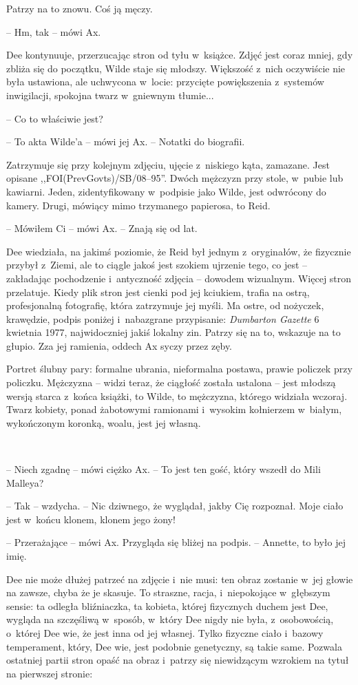 \documentclass[oneside,polish,11pt,sfheadings]{mwbk}
\begin{document}
Patrzy na to znowu. Coś ją męczy.

-- Hm, tak -- mówi Ax.

Dee kontynuuje, przerzucając stron od tyłu w~książce. Zdjęć jest coraz
mniej, gdy zbliża się do początku, Wilde staje się młodszy. Większość z~nich oczywiście nie była ustawiona, ale uchwycona w~locie: przycięte
powiększenia z~systemów inwigilacji, spokojna twarz w~gniewnym tłumie...

-- Co to właściwie jest?

-- To akta Wilde'a -- mówi jej Ax. -- Notatki do biografii.

Zatrzymuje się przy kolejnym zdjęciu, ujęcie z~niskiego kąta, zamazane.
Jest opisane ,,FOI(PrevGovts)/SB/08--95''. Dwóch mężczyzn przy stole, w~pubie lub kawiarni. Jeden, zidentyfikowany w~podpisie jako Wilde, jest
odwrócony do kamery. Drugi, mówiący mimo trzymanego papierosa, to Reid.

-- Mówiłem Ci -- mówi Ax. -- Znają się od lat.

Dee wiedziała, na jakimś poziomie, że Reid był jednym z~oryginałów, że
fizycznie przybył z~Ziemi, ale to ciągle jakoś jest szokiem ujrzenie
tego, co jest -- zakładając pochodzenie i~antyczność zdjęcia -- dowodem
wizualnym. Więcej stron przelatuje. Kiedy plik stron jest cienki pod jej
kciukiem, trafia na ostrą, profesjonalną fotografię, która zatrzymuje
jej myśli. Ma ostre, od nożyczek, krawędzie, podpis poniżej i~nabazgrane
przypisanie: \emph{Dumbarton Gazette} 6 kwietnia 1977, najwidoczniej
jakiś lokalny zin. Patrzy się na to, wskazuje na to głupio. Zza jej
ramienia, oddech Ax syczy przez zęby.

Portret ślubny pary: formalne ubrania, nieformalna postawa, prawie
policzek przy policzku. Mężczyzna -- widzi teraz, że ciągłość została
ustalona -- jest młodszą wersją starca z~końca książki, to Wilde, to
mężczyzna, którego widziała wczoraj. Twarz kobiety, ponad żabotowymi
ramionami i~wysokim kołnierzem w~białym, wykończonym koronką, woalu,
jest jej własną.

~

-- Niech zgadnę -- mówi ciężko Ax. -- To jest ten gość, który wszedł do
Mili Malleya?

-- Tak -- wzdycha. -- Nic dziwnego, że wyglądał, jakby Cię rozpoznał. Moje
ciało jest w~końcu klonem, klonem jego żony!

-- Przerażające -- mówi Ax. Przygląda się bliżej na podpis. -- Annette, to
było jej imię.

Dee nie może dłużej patrzeć na zdjęcie i~nie musi: ten obraz zostanie w~jej głowie na zawsze, chyba że je skasuje. To straszne, racja, i~niepokojące w~głębszym sensie: ta odległa bliźniaczka, ta kobieta,
której fizycznych duchem jest Dee, wygląda na szczęśliwą w~sposób, w~który Dee nigdy nie była, z~osobowością, o~której Dee wie, że jest inna
od jej własnej. Tylko fizyczne ciało i~bazowy temperament, który, Dee
wie, jest podobnie genetyczny, są takie same. Pozwala ostatniej partii
stron opaść na obraz i~patrzy się niewidzącym wzrokiem na tytuł na
pierwszej stronie:
\end{document}
